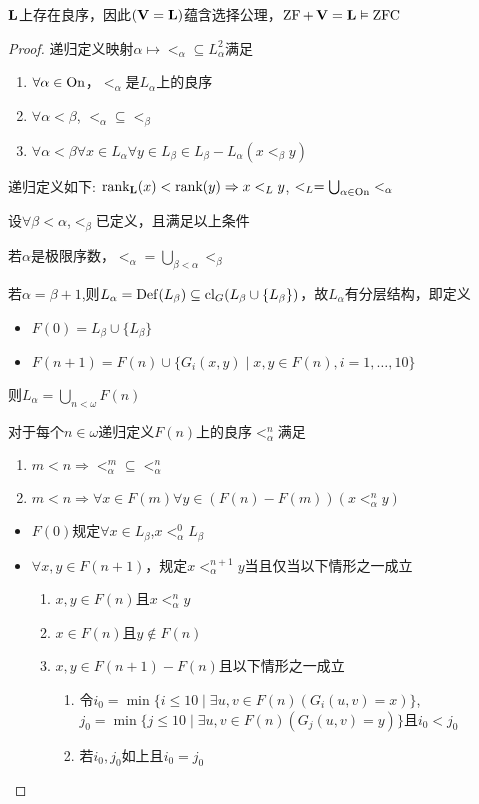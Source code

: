\documentclass[11pt]{article}
\DeclareMathOperator{\rankl}{\rank_{\bL}}
\begin{document}
\begin{theorem}[ZF]
\(\operatorname{\textbf{L}}\)上存在良序，因此\((\operatorname{\textbf{V}}=\operatorname{\textbf{L}})\)蕴含选择公理，\(\operatorname{ZF}+\operatorname{\textbf{V}}=\operatorname{\textbf{L}}\vDash\operatorname{ZFC}\)
\end{theorem}

\begin{proof}
递归定义映射\(\alpha\mapsto<_\alpha\subseteq L_\alpha^2\)满足
\begin{enumerate}
\item \(\forall\alpha\in\operatorname{On}\)，\(<_\alpha\)是\(L_\alpha\)上的良序
\item \(\forall\alpha<\beta\), \(<_\alpha\subseteq<_\beta\)
\item \(\forall\alpha<\beta\forall x\in L_\alpha\forall y\in L_\beta\in L_\beta-L_\alpha(x<_\beta y)\)
\end{enumerate}


递归定义如下:
\(\rankl(x)<\rank(y)\Rightarrow x<_Ly\), \(<_L=\bigcup_{\alpha\in\operatorname{On}}<_\alpha\)

设\(\forall\beta<\alpha\),\(<_\beta\)已定义，且满足以上条件

若\(\alpha\)是极限序数，\(<_\alpha=\bigcup_{\beta<\alpha}<_\beta\)

若\(\alpha=\beta+1\),则\(L_\alpha=\operatorname{Def}(L_\beta)\subseteq\operatorname{\text{cl}}_G(L_\beta\cup\{L_\beta\})\)，故\(L_\alpha\)有分层结构，即定义
\begin{itemize}
\item \(F(0)=L_\beta\cup\{L_\beta\}\)
\item \(F(n+1)=F(n)\cup\{G_i(x,y)\mid x,y\in F(n),i=1,\dots,10\}\)
\end{itemize}


则\(L_\alpha=\bigcup_{n<\omega}F(n)\)

对于每个\(n\in\omega\)递归定义\(F(n)\)上的良序\(<_\alpha^n\)满足
\begin{enumerate}
\item \(m<n\Rightarrow<_\alpha^m\subseteq<_\alpha^n\)
\item \(m<n\Rightarrow\forall x\in F(m)\forall y\in(F(n)-F(m))(x<_\alpha^ny)\)
\end{enumerate}


\begin{itemize}
\item \(F(0)\)规定\(\forall x\in L_\beta\),\(x<_\alpha^0L_\beta\)
\item \(\forall x,y\in F(n+1)\)，规定\(x<_\alpha^{n+1}y\)当且仅当以下情形之一成立
\begin{enumerate}
\item \(x,y\in F(n)\)且\(x<_\alpha^ny\)
\item \(x\in F(n)\)且\(y\notin F(n)\)
\item \(x,y\in F(n+1)-F(n)\)且以下情形之一成立
\begin{enumerate}
\item 令\(i_0=\min\{i\le 10\mid\exists u,v\in F(n)(G_i(u,v)=x)\}\),
\(j_0=\min\{j\le 10\mid\exists u,v\in F(n)(G_j(u,v)=y)\}\)且\(i_0<j_0\)
\item 若\(i_0,j_0\)如上且\(i_0=j_0\)


\end{enumerate}
\end{enumerate}
\end{itemize}
\end{proof}
\end{document}
